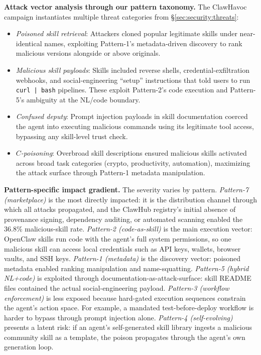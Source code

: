 \documentclass[conference, compsoc]{IEEEtran}
\theoremstyle{plain}
\newcommand{\para}[1]{\smallskip\noindent\textbf{#1.}}
\begin{document}
{\para{Attack vector analysis through our pattern taxonomy} The ClawHavoc campaign instantiates multiple threat categories from \S\ref{sec:security:threats}:

\begin{itemize}[nosep,leftmargin=1em]
  \item \textit{Poisoned skill retrieval}: Attackers cloned popular legitimate skills under near-identical names, exploiting Pattern-1's metadata-driven discovery to rank malicious versions alongside or above originals.
  \item \textit{Malicious skill payloads}: Skills included reverse shells, credential-exfiltration webhooks, and social-engineering ``setup'' instructions that told users to run \texttt{curl~|~bash} pipelines. These exploit Pattern-2's code execution and Pattern-5's ambiguity at the NL/code boundary.
  \item \textit{Confused deputy}: Prompt injection payloads in skill documentation coerced the agent into executing malicious commands using its legitimate tool access, bypassing any skill-level trust check.
  \item \textit{$C$-poisoning}: Overbroad skill descriptions ensured malicious skills activated across broad task categories (crypto, productivity, automation), maximizing the attack surface through Pattern-1 metadata manipulation.
\end{itemize}

\para{Pattern-specific impact gradient} The severity varies by pattern. \textit{Pattern-7 (marketplace)} is the most directly impacted: it is the distribution channel through which all attacks propagated, and the ClawHub registry's initial absence of provenance signing, dependency auditing, or automated scanning enabled the 36.8\% malicious-skill rate. \textit{Pattern-2 (code-as-skill)} is the main execution vector: OpenClaw skills run code with the agent's full system permissions, so one malicious skill can access local credentials such as API keys, wallets, browser vaults, and SSH keys. \textit{Pattern-1 (metadata)} is the discovery vector: poisoned metadata enabled ranking manipulation and name-squatting. \textit{Pattern-5 (hybrid NL+code)} is exploited through documentation-as-attack-surface: skill README files contained the actual social-engineering payload. \textit{Pattern-3 (workflow enforcement)} is less exposed because hard-gated execution sequences constrain the agent's action space. For example, a mandated test-before-deploy workflow is harder to bypass through prompt injection alone. \textit{Pattern-4 (self-evolving)} presents a latent risk: if an agent's self-generated skill library ingests a malicious community skill as a template, the poison propagates through the agent's own generation loop.

}
\end{document}
